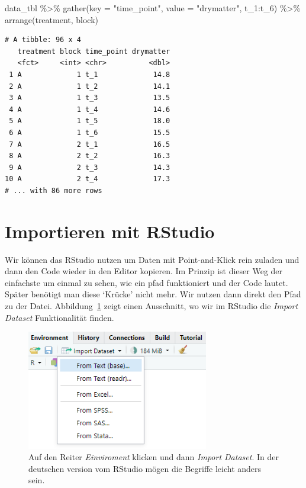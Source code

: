 \documentclass[
  letterpaper,
  DIV=11,
  oneside]{scrreport}
\newenvironment{Shaded}{\begin{snugshade}}{\end{snugshade}}
\newcommand{\AttributeTok}[1]{\textcolor[rgb]{0.40,0.45,0.13}{#1}}
\newcommand{\FunctionTok}[1]{\textcolor[rgb]{0.28,0.35,0.67}{#1}}
\newcommand{\NormalTok}[1]{\textcolor[rgb]{0.00,0.23,0.31}{#1}}
\newcommand{\SpecialCharTok}[1]{\textcolor[rgb]{0.37,0.37,0.37}{#1}}
\newcommand{\StringTok}[1]{\textcolor[rgb]{0.13,0.47,0.30}{#1}}
\begin{document}
\begin{Shaded}
\begin{Highlighting}[]
\NormalTok{data\_tbl }\SpecialCharTok{\%\textgreater{}\%} 
  \FunctionTok{gather}\NormalTok{(}\AttributeTok{key =} \StringTok{"time\_point"}\NormalTok{, }\AttributeTok{value =} \StringTok{"drymatter"}\NormalTok{, t\_1}\SpecialCharTok{:}\NormalTok{t\_6) }\SpecialCharTok{\%\textgreater{}\%} 
  \FunctionTok{arrange}\NormalTok{(treatment, block)}
\end{Highlighting}
\end{Shaded}

\begin{verbatim}
# A tibble: 96 x 4
   treatment block time_point drymatter
   <fct>     <int> <chr>          <dbl>
 1 A             1 t_1             14.8
 2 A             1 t_2             14.1
 3 A             1 t_3             13.5
 4 A             1 t_4             14.6
 5 A             1 t_5             18.0
 6 A             1 t_6             15.5
 7 A             2 t_1             16.5
 8 A             2 t_2             16.3
 9 A             2 t_3             14.3
10 A             2 t_4             17.3
# ... with 86 more rows
\end{verbatim}

\hypertarget{importieren-mit-rstudio}{%
\section{Importieren mit RStudio}\label{importieren-mit-rstudio}}

Wir können das RStudio nutzen um Daten mit Point-and-Klick rein zuladen
und dann den Code wieder in den Editor kopieren. Im Prinzip ist dieser
Weg der einfachste um einmal zu sehen, wie ein pfad funktioniert und der
Code lautet. Später benötigt man diese `Krücke' nicht mehr. Wir nutzen
dann direkt den Pfad zu der Datei. Abbildung~\ref{fig-imp-01} zeigt
einen Ausschnitt, wo wir im RStudio die \emph{Import Dataset}
Funktionalität finden.

\begin{figure}

{\centering \includegraphics[width=3.125in,height=\textheight]{./images/import_01.PNG}

}

\caption{\label{fig-imp-01}Auf den Reiter \emph{Einviroment} klicken und
dann \emph{Import Dataset}. In der deutschen version vom RStudio mögen
die Begriffe leicht anders sein.}

\end{figure}
\end{document}
